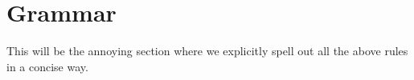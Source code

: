 \section{Grammar}
This will be the annoying section where we explicitly spell out all the above rules
in a concise way.
